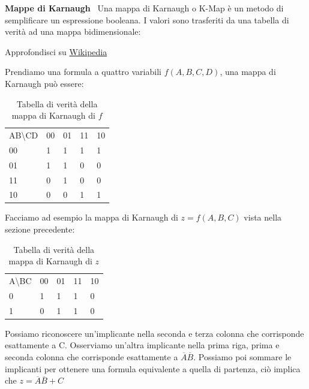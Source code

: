 \begin{defn}
	\textbf{Mappe di Karnaugh} \	
	Una mappa di Karnaugh o K-Map è un metodo di semplificare un espressione booleana. I valori sono trasferiti da una tabella di verità ad una mappa bidimensionale:
	
	Approfondisci su \href{https://en.wikipedia.org/wiki/Karnaugh_map}{Wikipedia}
	
	Prendiamo una formula a quattro variabili $ f(A,B,C,D) $, una mappa di Karnaugh può essere:
	\begin{table}[H]
		\centering
		\caption{Tabella di verità della mappa di Karnaugh di $f$}
		\label{tab:karnaugh}
		\begin{tabular}{lllll}
			AB\textbackslash{}CD    & 00                     & 01                     & 11                     & 10                     \\ \cline{2-5} 
			\multicolumn{1}{l|}{00} & \multicolumn{1}{l|}{1} & \multicolumn{1}{l|}{1} & \multicolumn{1}{l|}{1} & \multicolumn{1}{l|}{1} \\ \cline{2-5} 
			\multicolumn{1}{l|}{01} & \multicolumn{1}{l|}{1} & \multicolumn{1}{l|}{1} & \multicolumn{1}{l|}{0} & \multicolumn{1}{l|}{0} \\ \cline{2-5} 
			\multicolumn{1}{l|}{11} & \multicolumn{1}{l|}{0} & \multicolumn{1}{l|}{1} & \multicolumn{1}{l|}{0} & \multicolumn{1}{l|}{0} \\ \cline{2-5} 
			\multicolumn{1}{l|}{10} & \multicolumn{1}{l|}{0} & \multicolumn{1}{l|}{0} & \multicolumn{1}{l|}{1} & \multicolumn{1}{l|}{1} \\ \cline{2-5} 
		\end{tabular}
	\end{table}
	
	Facciamo ad esempio la mappa di Karnaugh di $ z = f(A,B,C) $ vista nella sezione precedente:
	
	\begin{table}[H]
		\centering
		\caption{Tabella di verità della mappa di Karnaugh di $z$}
		\label{tab:karnaugh}
		\begin{tabular}{lllll}
			A\textbackslash{}BC    & 00                     & 01                     & 11                     & 10                     \\ \cline{2-5} 
			\multicolumn{1}{l|}{0} & \multicolumn{1}{l|}{1} & \multicolumn{1}{l|}{1} & \multicolumn{1}{l|}{1} & \multicolumn{1}{l|}{0} \\ \cline{2-5} 
			\multicolumn{1}{l|}{1} & \multicolumn{1}{l|}{0} & \multicolumn{1}{l|}{1} & \multicolumn{1}{l|}{1} & \multicolumn{1}{l|}{0} \\ \cline{2-5} 
		\end{tabular}
	\end{table}
	
	Possiamo riconoscere un'implicante nella seconda e terza colonna che corrisponde esattamente a C. Osserviamo un'altra implicante nella prima riga, prima e seconda colonna che corrisponde esattamente a $ \overbar{A}\overbar{B} $. Possiamo poi sommare le implicanti per ottenere una formula equivalente a quella di partenza, ciò implica che $ z =  \overbar{A}\overbar{B} + C $
\end{defn}

